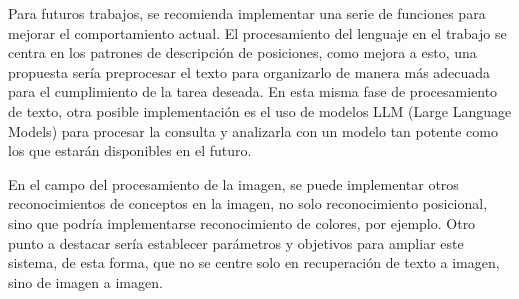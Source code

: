 \begin{recomendations}
    Para futuros trabajos, se recomienda implementar una serie de funciones para mejorar el comportamiento actual. El procesamiento del lenguaje en el trabajo se centra en los patrones de descripción de posiciones, como mejora a esto, una propuesta sería preprocesar el texto para organizarlo de manera más adecuada para el cumplimiento de la tarea deseada. En esta misma fase de procesamiento de texto, otra posible implementación es el uso de modelos LLM (Large Language Models) para procesar la consulta y analizarla con un modelo tan potente como los que estarán disponibles en el futuro.
    
    En el campo del procesamiento de la imagen, se puede implementar otros reconocimientos de conceptos en la imagen, no solo reconocimiento posicional, sino que podría implementarse reconocimiento de colores, por ejemplo. Otro punto a destacar sería establecer parámetros y objetivos para ampliar este sistema, de esta forma, que no se centre solo en recuperación de texto a imagen, sino de imagen a imagen.
        
    \end{recomendations}
    